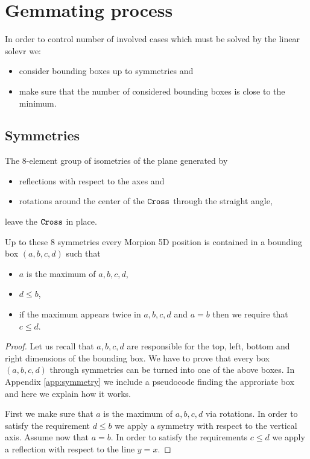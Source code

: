\section{Gemmating process}
\label{sec:gemmating}

In order to control number of involved cases which must be solved by the linear solevr 
we:\begin{itemize}
\item consider bounding boxes up to symmetries and 
\item make sure that the number of considered bounding boxes is close to the minimum.
\end{itemize}

\subsection{Symmetries}
The $8$-element group of isometries of the plane generated by 
\begin{itemize}
\item reflections with respect to the axes and 
\item rotations around the center of the $\texttt{Cross}$ through the straight angle,
\end{itemize}
leave the $\texttt{Cross}$ in place. 
\begin{lemma}
Up to these $8$ symmetries every Morpion 5D position is contained in a bounding box $(a,b,c,d)$ such that
\begin{itemize}
\item $a$ is the maximum of $a,b,c,d$,
\item $d\leq b$,
\item if the maximum appears twice in $a,b,c,d$ and $a=b$ then we require that $c\leq d$. 
\end{itemize}
\end{lemma}

\begin{proof}
Let us recall that $a,b,c,d$ are responsible for the top, left, bottom and right dimensions of the bounding box. 
We have to prove that every box $(a,b,c,d)$ through symmetries can be turned into one of the above boxes. 
In Appendix \ref{app:symmetry} we include a pseudocode finding the approriate box and here we explain how it works. 

First we make sure that $a$ is the maximum 
of $a,b,c,d$ via rotations. In order to satisfy the requirement $d\leq b$ we apply a symmetry with respect to the vertical axis. 
Assume now that $a=b$. In order to satisfy the requirements  $c\leq d$ we apply a  reflection with respect to the line $y=x$.
\end{proof}



